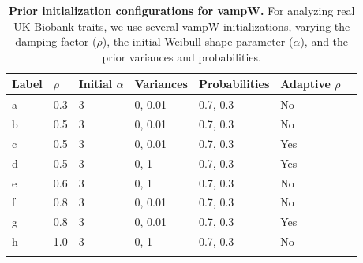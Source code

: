 \clearpage

\begin{table}[H]
    \caption[Prior initialization configurations for vampW]{\textbf{Prior initialization configurations for vampW.} For analyzing real UK Biobank traits, we use several vampW initializations, varying the damping factor ($\rho$), the initial Weibull shape parameter ($\alpha$), and the prior variances and probabilities. \label{tab:sim_params}}
    \begin{center}
    \setlength{\tabcolsep}{5pt}%
    \begin{tabular}{lllllll}
    \toprule
    \bf{Label} & \bf{$\rho$} & \bf{Initial $\alpha$}  & \bf{Variances} & \bf{Probabilities} & \bf{Adaptive $\rho$} \\ 
    \midrule
    a & 0.3 & 3 & 0, 0.01 & 0.7, 0.3 & No \\
    b & 0.5 & 3 & 0, 0.01 & 0.7, 0.3 & No \\
    c & 0.5 & 3 & 0, 0.01 & 0.7, 0.3 & Yes \\
    d & 0.5 & 3 & 0, 1    & 0.7, 0.3 & Yes \\
    e & 0.6 & 3 & 0, 1    & 0.7, 0.3 & No \\
    f & 0.8 & 3 & 0, 0.01 & 0.7, 0.3 & No \\
    g & 0.8 & 3 & 0, 0.01 & 0.7, 0.3 & Yes \\
    h & 1.0 & 3 & 0, 1    & 0.7, 0.3 & No \\
    \botrule
    \end{tabular}
    \end{center}
\end{table}

\clearpage

